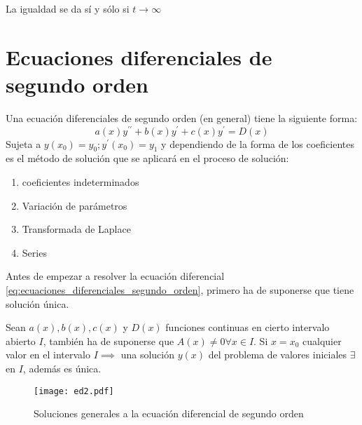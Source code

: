 La igualdad se da sí y sólo si $t\to \infty$

\section{Ecuaciones diferenciales de segundo orden}

Una ecuación diferenciales de segundo orden (en general) tiene la siguiente forma:
\begin{equation}
    a(x)y^{\prime\prime} + b(x)y^{\prime} + c(x)y^{\prime} = D(x)
    \label{eq:ecuaciones_diferenciales_segundo_orden}
\end{equation}
Sujeta a $y(x_0)=y_0; y^{\prime}\left( x_0 \right)=y_1$
y dependiendo de la forma de los coeficientes es el método de solución que se aplicará en el proceso de solución:
\begin{enumerate}
    \item coeficientes indeterminados
    \item Variación de parámetros
    \item Transformada de Laplace
    \item Series
\end{enumerate}
Antes de empezar a resolver la ecuación diferencial \eqref{eq:ecuaciones_diferenciales_segundo_orden}, primero ha de suponerse que tiene solución  única.
\begin{theorem}
    Sean $a(x),b(x),c(x)$ y $D(x)$ funciones continuas en cierto intervalo abierto $I$, también ha de suponerse que $A(x)\neq 0\forall x\in I$. Si $x=x_0$ cualquier valor en el intervalo $I\implies$ una solución $y(x)$ del problema de valores iniciales $\exists$ en $I$, además es única.
\end{theorem}

\begin{figure}[h!]
\centering
  \texttt{[image: ed2.pdf]}
  \caption{Soluciones generales a la ecuación diferencial de segundo orden}
  \label{ed2}
\end{figure}

